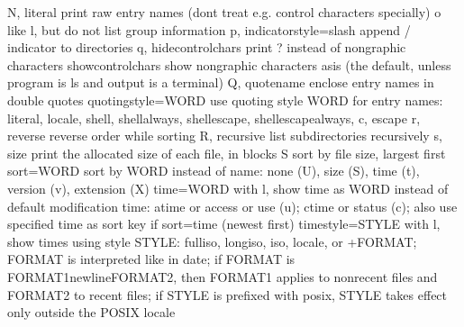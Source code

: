 \documentclass[letterpaper,12pt,english]{sphinxmanual}
\begin{document}
\begin{sphinxVerbatim}[commandchars=\\\{\}]
  \PYGZhy{}N, \PYGZhy{}\PYGZhy{}literal              print raw entry names (don\PYGZsq{}t treat e.g.   control
                               characters specially)
  \PYGZhy{}o                         like \PYGZhy{}l, but do not list group information
  \PYGZhy{}p, \PYGZhy{}\PYGZhy{}indicator\PYGZhy{}style=slash
                             append / indicator to directories
  \PYGZhy{}q, \PYGZhy{}\PYGZhy{}hide\PYGZhy{}control\PYGZhy{}chars   print ? instead of nongraphic characters
      \PYGZhy{}\PYGZhy{}show\PYGZhy{}control\PYGZhy{}chars   show nongraphic characters as\PYGZhy{}is (the   default,
                               unless program is \PYGZsq{}ls\PYGZsq{} and output is a   terminal)
  \PYGZhy{}Q, \PYGZhy{}\PYGZhy{}quote\PYGZhy{}name           enclose entry names in double quotes
      \PYGZhy{}\PYGZhy{}quoting\PYGZhy{}style=WORD   use quoting style WORD for entry names:
                               literal, locale, shell, shell\PYGZhy{}always,
                               shell\PYGZhy{}escape, shell\PYGZhy{}escape\PYGZhy{}always, c,   escape
  \PYGZhy{}r, \PYGZhy{}\PYGZhy{}reverse              reverse order while sorting
  \PYGZhy{}R, \PYGZhy{}\PYGZhy{}recursive            list subdirectories recursively
  \PYGZhy{}s, \PYGZhy{}\PYGZhy{}size                 print the allocated size of each file, in   blocks
  \PYGZhy{}S                         sort by file size, largest first
      \PYGZhy{}\PYGZhy{}sort=WORD            sort by WORD instead of name: none (\PYGZhy{}U),   size (\PYGZhy{}S),
                               time (\PYGZhy{}t), version (\PYGZhy{}v), extension (\PYGZhy{}X)
      \PYGZhy{}\PYGZhy{}time=WORD            with \PYGZhy{}l, show time as WORD instead of default
                               modification time: atime or access or use   (\PYGZhy{}u);
                               ctime or status (\PYGZhy{}c); also use specified   time
                               as sort key if \PYGZhy{}\PYGZhy{}sort=time (newest first)
      \PYGZhy{}\PYGZhy{}time\PYGZhy{}style=STYLE     with \PYGZhy{}l, show times using style STYLE:
                               full\PYGZhy{}iso, long\PYGZhy{}iso, iso, locale, or   +FORMAT;
                               FORMAT is interpreted like in \PYGZsq{}date\PYGZsq{}; if   FORMAT
                               is FORMAT1\PYGZlt{}newline\PYGZgt{}FORMAT2, then FORMAT1   applies
                               to non\PYGZhy{}recent files and FORMAT2 to recent   files;
                               if STYLE is prefixed with \PYGZsq{}posix\PYGZhy{}\PYGZsq{}, STYLE
                               takes effect only outside the POSIX locale

\end{sphinxVerbatim}
\end{document}

